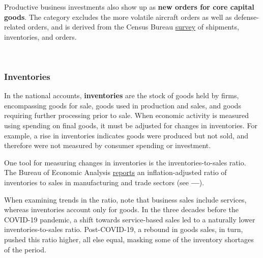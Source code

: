 \begin{minipage}{0.30\textwidth}
\small Productive business investments also show up as \textbf{new orders for core capital goods}. The category excludes the more volatile aircraft orders as well as defense-related orders, and is derived from the Census Bureau \href{https://www.census.gov/manufacturing/m3/index.html}{survey} of shipments, inventories, and orders.  


\end{minipage} \hspace{5mm}
\begin{minipage}{0.42\textwidth}
\\
\edef\custticks{{1992-01-01}, \afticks}
\end{minipage}
\vspace{7mm}

\subsubsection*{Inventories} 
\begin{minipage}{0.76\textwidth}   
\small In the national accounts, \textbf{inventories} are the stock of goods held by firms, encompassing goods for sale, goods used in production and sales, and goods requiring further processing prior to sale. When economic activity is measured using spending on final goods, it must be adjusted for changes in inventories. For example, a rise in inventories indicates goods were produced but not sold, and therefore were not measured by consumer spending or investment. 

One tool for measuring changes in inventories is the inventories-to-sales ratio. The Bureau of Economic Analysis \href{https://apps.bea.gov/iTable/index_UD.cfm}{reports} an inflation-adjusted ratio of inventories to sales in manufacturing and trade sectors (see {\color{blue!60!green}\textbf{---}}). 

When examining trends in the ratio, note that business sales include services, whereas inventories account only for goods. In the three decades before the COVID-19 pandemic, a shift towards service-based sales led to a naturally lower inventories-to-sales ratio. Post-COVID-19, a rebound in goods sales, in turn, pushed this ratio higher, all else equal, masking some of the inventory shortages of the period. 
\end{minipage}

